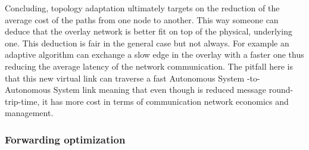 Concluding, topology adaptation ultimately targets on the reduction of the
average cost of the paths from one node to another. This way someone can deduce
that the overlay network is better fit on top of the physical, underlying one.
This deduction is fair in the general case but not always. For example an
adaptive algorithm can exchange a slow edge in the overlay with a faster one
thus reducing the average latency of the network communication. The pitfall here
is that this new virtual link can traverse a fast Autonomous System -to-
Autonomous System link meaning that even though is reduced message
round-trip-time, it has more cost in terms of communication network economics
and management.

%
%
%
%

\subsubsection{Forwarding optimization}

